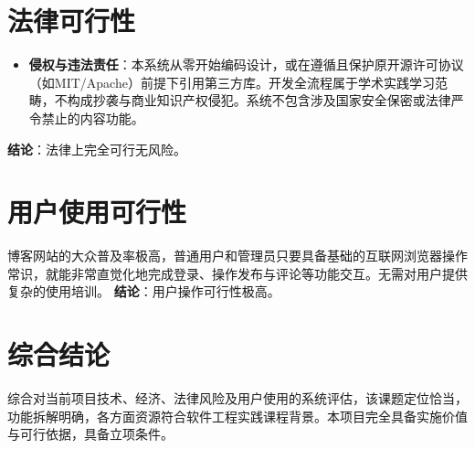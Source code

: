 \documentclass[12pt, a4paper]{ctexart}
\begin{document}
\section{法律可行性}
\begin{itemize}
    \item \textbf{侵权与违法责任}：本系统从零开始编码设计，或在遵循且保护原开源许可协议（如MIT/Apache）前提下引用第三方库。开发全流程属于学术实践学习范畴，不构成抄袭与商业知识产权侵犯。系统不包含涉及国家安全保密或法律严令禁止的内容功能。
\end{itemize}
\textbf{结论}：法律上完全可行无风险。

\section{用户使用可行性}
博客网站的大众普及率极高，普通用户和管理员只要具备基础的互联网浏览器操作常识，就能非常直觉化地完成登录、操作发布与评论等功能交互。无需对用户提供复杂的使用培训。
\textbf{结论}：用户操作可行性极高。

\section{综合结论}
综合对当前项目技术、经济、法律风险及用户使用的系统评估，该课题定位恰当，功能拆解明确，各方面资源符合软件工程实践课程背景。本项目完全具备实施价值与可行依据，具备立项条件。
\end{document}
